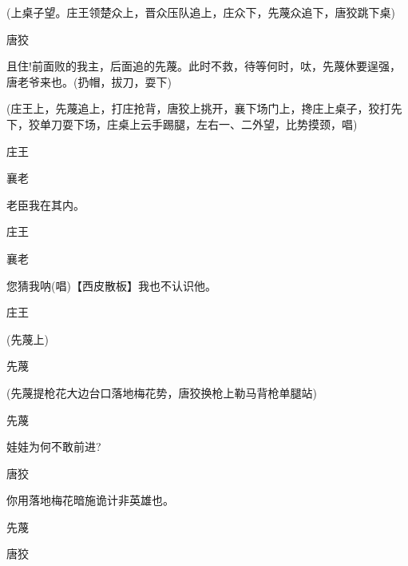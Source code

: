 {(上桌子望。庄王领楚众上，晋众压队追上，庄众下，先蔑众追下，唐狡跳下桌)

唐狡

且住!前面败的我主，后面追的先蔑。此时不救，待等何时，呔，先蔑休要逞强，唐老爷来也。(扔帽，拔刀，耍下)

\vspace{5pt}

(庄王上，先蔑追上，打庄抢背，唐狡上挑开，襄下场门上，搀庄上桌子，狡打先下，狡单刀耍下场，庄桌上云手踢腿，左右一、二外望，比势摸颈，唱)

庄王


襄老\hspace{30pt}~

老臣我在其内。

庄王\hspace{30pt}~


襄老\hspace{30pt}~

您猜我呐(唱)【{\akai 西皮散板}】我也不认识他。

庄王\hspace{30pt}~


(先蔑上)

先蔑


(先蔑提枪花大边台口落地梅花势，唐狡换枪上勒马背枪单腿站)

先蔑\hspace{30pt}~

娃娃为何不敢前进?

唐狡\hspace{30pt}~

你用落地梅花暗施诡计非英雄也。

先蔑


唐狡\hspace{30pt}~

}
